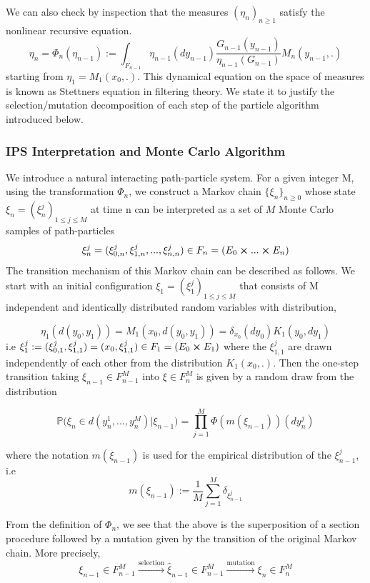 We can also check by inspection that the measures $(\eta_n)_{n\geq 1}$ satisfy the nonlinear recursive equation.
$$\eta_n = \varPhi_n(\eta_{n-1}) := \int_{F_{n-1}} \eta_{n-1}(dy_{n-1}) \frac{G_{n-1}(y_{n-1})}{\eta_{n-1}(G_{n-1})} M_n(y_{n-1},.)$$
starting from $\eta_1 = M_1(x_0,.)$. This dynamical equation on the space of measures is known as Stettners equation in filtering theory. We state it to justify the selection/mutation decomposition of each step of the particle algorithm introduced below.


\subsubsection{IPS Interpretation and Monte Carlo Algorithm}
We introduce a natural interacting path-particle system. For a given integer M, using the transformation $\varPhi_n$, we construct a Markov chain $\{\xi_n\}_{n\geq 0}$ whose state $\xi_n = (\xi_n^j)_{1\leq j \leq M}$ at time n can be interpreted as a set of $M$ Monte Carlo samples of path-particles 
$$\xi_n^j = (\xi_{0,n}^j, \xi_{1,n}^j,..., \xi_{n,n}^j) \in F_n = (E_0 \cross ... \cross E_n)$$
The transition mechanism of this Markov chain can be described as follows. We start with an initial configuration $\xi_1 = (\xi_1^j)_{1\leq j \leq M}$ that consists of M independent and identically distributed random variables with distribution,

$$\eta_1(d(y_0,y_1)) = M_1(x_0,d(y_0,y_1)) = \delta_{x_0}(dy_0)K_1(y_0, dy_1) $$
i.e $\xi_1^j := (\xi_{0,1}^j,\xi_{1,1}^j) = (x_0, \xi_{1,1}^j) \in F_1 = (E_0 \cross E_1)$ where the $\xi_{1,1}^j$ are drawn independently of each other from the distribution $K_1(x_0,.)$. Then the one-step transition taking $\xi_{n-1} \in F_{n-1}^M$ into $\xi \in F_n^M$ is given by a random draw from the distribution

\begin{equation}
\mathbb{P}\big( \xi_n \in d(y_n^1,...,y_n^M)|\xi_{n-1}  \big) = \prod_{j=1}^{M}\varPhi(m(\xi_{n-1}))(dy_n^j)
\end{equation}

where the notation $m(\xi_{n-1})$ is used for the empirical distribution of the $\xi_{n-1}^j$, i.e
$$m(\xi_{n-1}) := \frac{1}{M}\sum_{j=1}^{M}\delta_{\xi_{n-1}^{j}}$$

From the definition of $\varPhi_n$, we see that the above is the superposition of a section procedure followed by a mutation given by the transition of the original Markov chain. More precisely,
$$\xi_{n-1} \in F_{n-1}^{M}  \xrightarrow{\text{selection}} \hat{\xi}_{n-1} \in F_{n-1}^M \xrightarrow{\text{mutation}} \xi_n \in F_n^M$$


